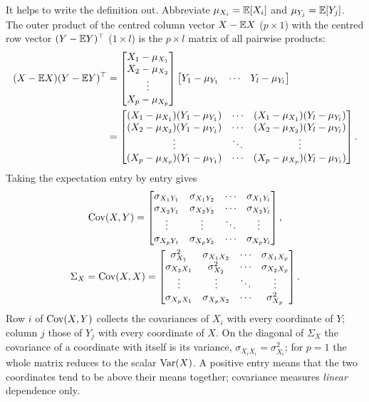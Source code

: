 \begin{notechapter}
It helps to write the definition out. Abbreviate $\mu_{X_i} = \mathbb{E}[X_i]$ and
$\mu_{Y_j} = \mathbb{E}[Y_j]$. The outer product of the centred column vector
$X - \mathbb{E} X$ ($p\times1$) with the centred row vector $(Y - \mathbb{E} Y)^\top$
($1\times l$) is the $p\times l$ matrix of all pairwise products:
\begin{align*}
  (X - \mathbb{E} X)(Y - \mathbb{E} Y)^\top &=
  \begin{bmatrix} X_1 - \mu_{X_1}\\ X_2 - \mu_{X_2}\\ \vdots\\ X_p - \mu_{X_p}\end{bmatrix}
  \begin{bmatrix} Y_1 - \mu_{Y_1} & \cdots & Y_l - \mu_{Y_l}\end{bmatrix}\\
  &=
  \begin{bmatrix}
    (X_1 - \mu_{X_1})(Y_1 - \mu_{Y_1}) & \cdots & (X_1 - \mu_{X_1})(Y_l - \mu_{Y_l})\\
    (X_2 - \mu_{X_2})(Y_1 - \mu_{Y_1}) & \cdots & (X_2 - \mu_{X_2})(Y_l - \mu_{Y_l})\\
    \vdots & \ddots & \vdots\\
    (X_p - \mu_{X_p})(Y_1 - \mu_{Y_1}) & \cdots & (X_p - \mu_{X_p})(Y_l - \mu_{Y_l})
  \end{bmatrix}.
\end{align*}
Taking the expectation entry by entry gives
\begin{gather*}
  \operatorname{Cov}(X,Y) =
  \begin{bmatrix}
    \sigma_{X_1Y_1} & \sigma_{X_1Y_2} & \cdots & \sigma_{X_1Y_l}\\
    \sigma_{X_2Y_1} & \sigma_{X_2Y_2} & \cdots & \sigma_{X_2Y_l}\\
    \vdots & \vdots & \ddots & \vdots\\
    \sigma_{X_pY_1} & \sigma_{X_pY_2} & \cdots & \sigma_{X_pY_l}
  \end{bmatrix},
  \\
  \Sigma_X = \operatorname{Cov}(X,X) =
  \begin{bmatrix}
    \sigma_{X_1}^2 & \sigma_{X_1X_2} & \cdots & \sigma_{X_1X_p}\\
    \sigma_{X_2X_1} & \sigma_{X_2}^2 & \cdots & \sigma_{X_2X_p}\\
    \vdots & \vdots & \ddots & \vdots\\
    \sigma_{X_pX_1} & \sigma_{X_pX_2} & \cdots & \sigma_{X_p}^2
  \end{bmatrix}.
\end{gather*}
Row $i$ of $\operatorname{Cov}(X,Y)$ collects the covariances of $X_i$ with every
coordinate of $Y$; column $j$ those of $Y_j$ with every coordinate of $X$. On
the diagonal of $\Sigma_X$ the covariance of a coordinate with itself is its
variance, $\sigma_{X_iX_i} = \sigma_{X_i}^2$; for $p = 1$ the whole matrix reduces
to the scalar $\operatorname{Var}(X)$. A positive entry means that the two coordinates tend
to be above their means together; covariance measures \emph{linear}
dependence only.


\end{notechapter}
